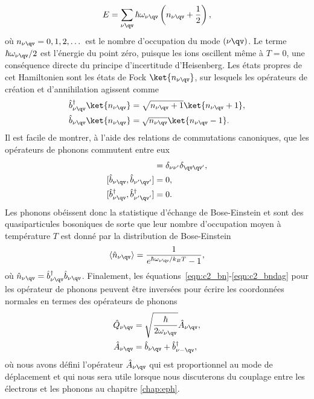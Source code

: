 \begin{equation}
    E = \sum_{\nu\qv}\hbar\omega_{\nu\qv}\left(n_{\nu\qv}+\frac{1}{2}\right),
\end{equation}
où $n_{\nu\qv}=0,1,2,\dots$ est le nombre d'occupation du mode $(\nu\qv)$. Le terme $\hbar\omega_{\nu\qv}/2$ est l'énergie du point zéro, puisque les ions oscillent même à $T=0$, une conséquence directe du principe d'incertitude d'Heisenberg. Les états propres de cet Hamiltonien sont les états de Fock $\ket{n_{\nu\qv}}$, sur lesquels les opérateurs de création et d'annihilation agissent comme
\begin{align}
    \hat{b}^\dag_{\nu\qv}\ket{n_{\nu\qv}}&=\sqrt{n_{\nu\qv}+1}\ket{n_{\nu\qv}+1},\label{eqn:c2_bn}\\
    \hat{b}_{\nu\qv}\ket{n_{\nu\qv}}&=\sqrt{n_{\nu\qv}}\ket{n_{\nu\qv}-1}.\label{eqn:c2_bndag}\\
\end{align}
Il est facile de montrer, à l'aide des relations de commutations canoniques, que les opérateurs de phonons commutent entre eux
\begin{align}
    [\hat{b}_{\nu\qv},\hat{b}_{\nu'\qv'}^\dag]&=\delta_{\nu\nu'}\delta_{\qv\qv'},\\
    [\hat{b}_{\nu\qv},\hat{b}_{\nu'\qv'}]&=0,\\
    [\hat{b}_{\nu\qv}^\dag,\hat{b}_{\nu'\qv'}^\dag]&=0.
\end{align}
Les phonons obéissent donc la statistique d'échange de Bose-Einstein et sont des quasiparticules bosoniques de sorte que leur nombre d'occupation moyen à température $T$ est donné par la distribution de Bose-Einstein
\begin{equation}
    \langle \hat{n}_{\nu\qv}\rangle =\frac{1}{e^{\hbar\omega_{\nu\qv}/k_BT}-1},
\end{equation}
où $\hat{n}_{\nu\qv}=\hat{b}^\dag_{\nu\qv}\hat{b}_{\nu\qv}$. Finalement, les équations~\eqref{eqn:c2_bn}-\eqref{eqn:c2_bndag} pour les opérateur de phonons peuvent être inversées pour écrire les coordonnées normales en termes des opérateurs de phonons
\begin{align}
    \hat{Q}_{\nu\qv}&=\sqrt{\frac{\hbar}{2\omega_{\nu\qv}}}\hat{A}_{\nu\qv}\label{eqn:c2_Qn},\\
    \hat{A}_{\nu\qv}&=\hat{b}_{\nu\qv}+\hat{b}_{\nu-\qv}^\dag,\label{eqn:c2_An}
\end{align}
où nous avons défini l'opérateur $\hat{A}_{\nu\qv}$ qui est proportionnel au mode de déplacement et qui nous sera utile lorsque nous discuterons du couplage entre les électrons et les phonons au chapitre \ref{chap:eph}.

